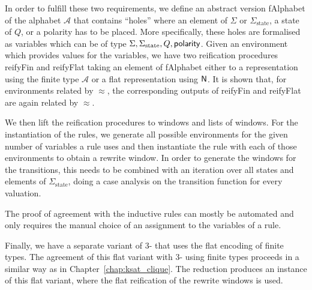In order to fulfill these two requirements, we define an abstract version \textsf{fAlphabet} of the alphabet $\mathcal{A}$ that contains ``holes'' where an element of $\Sigma$ or $\Sigma_{\text{state}}$, a state of $Q$, or a polarity has to be placed. 
More specifically, these holes are formalised as variables which can be of type $\Sigma, \Sigma_{\text{state}}, Q, \textsf{polarity}$. 
Given an environment which provides values for the variables, we have two reification procedures \textsf{reifyFin} and \textsf{reifyFlat} taking an element of \textsf{fAlphabet} either to a representation using the finite type $\mathcal{A}$ or a flat representation using $\mathsf{N}$.
It is shown that, for environments related by $\approx$, the corresponding outputs of \textsf{reifyFin} and \textsf{reifyFlat} are again related by $\approx$.

We then lift the reification procedures to windows and lists of windows.
For the instantiation of the rules, we generate all possible environments for the given number of variables a rule uses and then instantiate the rule with each of those environments to obtain a rewrite window.
In order to generate the windows for the transitions, this needs to be combined with an iteration over all states and elements of $\Sigma_{\text{state}}$, doing a case analysis on the transition function for every valuation.

The proof of agreement with the inductive rules can mostly be automated and only requires the manual choice of an assignment to the variables of a rule.

Finally, we have a separate variant of 3-\PR{} that uses the flat encoding of finite types. The agreement of this flat variant with 3-\PR{} using finite types proceeds in a similar way as in Chapter~\ref{chap:ksat_clique}.
The reduction produces an instance of this flat variant, where the flat reification of the rewrite windows is used. 

